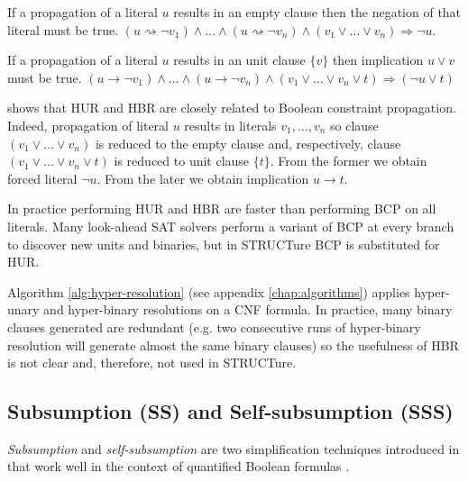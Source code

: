 \begin{myprop}
  If a propagation of a literal $u$ results in an empty clause then
  the negation of that literal must be true.
  $(u \rightsquigarrow \neg v_1) \land \ldots
  \land (u \rightsquigarrow \neg v_n) \land (v_1 \lor \dots \lor v_n)
  \Rightarrow \neg u$. 
\end{myprop}

\begin{myprop}
  If a propagation of a literal $u$ results in an unit clause $\{ v \}$
  then implication $u \lor v$ must be true.
  $(u \rightarrow \neg v_1) \land \ldots
  \land (u \rightarrow \neg v_n)
  \land (v_1 \lor \dots \lor v_n \lor t) \Rightarrow (\neg u \lor t)$
\end{myprop}

\cite{Bacchus03effectivepreprocessing} shows that HUR and HBR
are closely related to Boolean constraint propagation.  Indeed,
propagation of literal $u$ results in literals $v_1, \ldots, v_n$
so clause $(v_1 \lor \dots \lor v_n)$ is reduced to the empty
clause and, respectively, clause $(v_1 \lor \dots \lor v_n \lor
t)$ is reduced to unit clause $\{ t \}$. From the former we obtain
forced literal $\neg u$. From the later we obtain implication $u
\rightarrow t$.

In practice performing HUR and HBR are faster than performing BCP on
all literals. Many look-ahead SAT solvers perform a variant of BCP
\cite{Freeman:1995:IPS:220639} at every branch to discover new units
and binaries, but in STRUCTure BCP is substituted for HUR.

Algorithm \ref{alg:hyper-resolution} (see appendix
\ref{chap:algorithms}) applies hyper-unary and hyper-binary
resolutions on a CNF formula. In practice, many binary clauses
generated are redundant (e.g. two consecutive runs of hyper-binary
resolution will generate almost the same binary clauses) so the
usefulness of HBR is not clear and, therefore, not used in STRUCTure.


\subsection{Subsumption (SS) and Self-subsumption (SSS)}
\label{ssec:sss}

\emph{Subsumption} and \emph{self-subsumption} are two simplification
techniques introduced in \cite{Een05effectivepreprocessing}
that work well in the context of quantified Boolean formulas
\cite{Biere04resolveand}.

